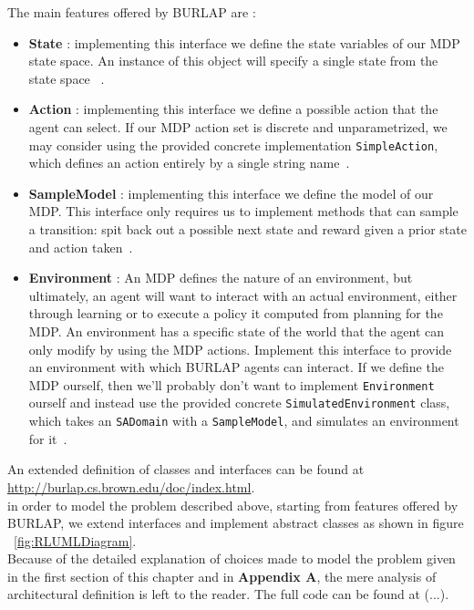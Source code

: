 The main features offered by BURLAP are :
	
\begin{itemize}
	\item \textbf{State} : implementing this interface we define the state variables of our MDP state space. An instance of this object will specify a single state from the state space~\cite{BURLAPSite} .
	\item \textbf{Action} : implementing this interface we define a possible action that the agent can select. If our MDP action set is discrete and unparametrized, we may consider using the provided concrete implementation {\tt SimpleAction}, which defines an action entirely by a single string name~\cite{BURLAPSite}.
	\item \textbf{SampleModel} : implementing this interface we define the model of our MDP. This interface only requires us to implement methods that can sample a transition: spit back out a possible next state and reward given a prior state and action taken~\cite{BURLAPSite}.
	\item  \textbf{Environment} : An MDP defines the nature of an environment, but ultimately, an agent will want to interact with an actual environment, either through learning or to execute a policy it computed from planning for the MDP. An environment has a specific state of the world that the agent can only modify by using the MDP actions. Implement this interface to provide an environment with which BURLAP agents can interact. If we define the MDP ourself, then we'll probably don't want to implement {\tt Environment} ourself and instead use the provided concrete {\tt SimulatedEnvironment} class, which takes an {\tt SADomain} with a {\tt SampleModel}, and simulates an environment for it~\cite{BURLAPSite}.
\end{itemize}

An extended definition of classes and interfaces can be found at \url{http://burlap.cs.brown.edu/doc/index.html}. \\

in order to model the problem described above, starting from features offered by BURLAP, we extend interfaces and implement abstract classes as shown in figure ~\ref{fig:RLUMLDiagram}. \\

Because of the detailed explanation of choices made to model the problem given in the first section of this chapter and in \textbf{Appendix A}, the mere analysis of architectural definition is left to the reader. The full code can be found at (...).

